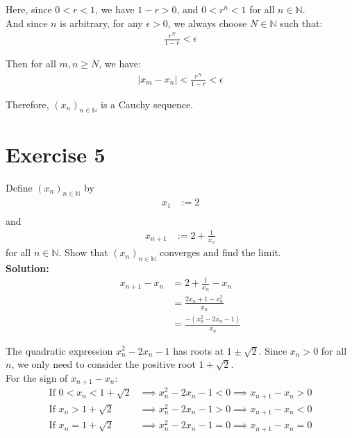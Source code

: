 \documentclass{article}
\begin{document}
Here, since $0 < r < 1$, we have $1 - r > 0$, and $0 < r^n < 1$ for all $n \in \mathbb{N}$. \\

And since $n$ is arbitrary, for any $\epsilon > 0$, we always choose $N \in \mathbb{N}$ such that:
\begin{align*}
\frac{r^N}{1 - r} < \epsilon
\end{align*}

Then for all $m, n \geq N$, we have:
\begin{align*}
|x_m - x_n| < \frac{r^N}{1 - r} < \epsilon
\end{align*}

Therefore, $(x_n)_{n \in \mathbb{N}}$ is a Cauchy sequence.

\newpage

\section*{Exercise 5}
Define $(x_n)_{n \in \mathbb{N}}$ by
\begin{align*}
x_1 &:= 2\\
\end{align*}
and
\begin{align*}
x_{n+1} &:= 2 + \frac{1}{x_n}
\end{align*}
for all $n \in \mathbb{N}$. Show that $(x_n)_{n \in \mathbb{N}}$ converges and find the limit. \\

\textbf{Solution: }
\begin{align*}
x_{n+1} - x_n &= 2 + \frac{1}{x_n} - x_n\\
&= \frac{2x_n + 1 - x_n^2}{x_n}\\
&= \frac{-(x_n^2 - 2x_n - 1)}{x_n}
\end{align*}

The quadratic expression $x_n^2 - 2x_n - 1$ has roots at $1 \pm \sqrt{2}$. Since $x_n > 0$ for all $n$, we only need to consider the positive root $1 + \sqrt{2}$. \\

For the sign of $x_{n+1} - x_n$:
\begin{align*}
\text{If } 0 < x_n < 1 + \sqrt{2} &\implies x_n^2 - 2x_n - 1 < 0 \implies x_{n+1} - x_n > 0\\
\text{If } x_n > 1 + \sqrt{2} &\implies x_n^2 - 2x_n - 1 > 0 \implies x_{n+1} - x_n < 0\\
\text{If } x_n = 1 + \sqrt{2} &\implies x_n^2 - 2x_n - 1 = 0 \implies x_{n+1} - x_n = 0
\end{align*}
\end{document}
